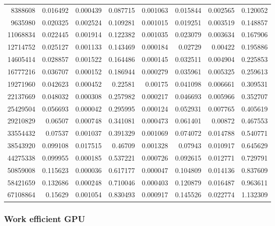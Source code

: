 \begin{tabular}{r r r r r r r r}
8388608 & 0.016492 & 0.000439 & 0.087715 & 0.001063 & 0.015844 & 0.002565 & 0.120052 \\
9635980 & 0.020325 & 0.002524 & 0.109281 & 0.001015 & 0.019251 & 0.003519 & 0.148857 \\
11068834 & 0.022445 & 0.001914 & 0.122382 & 0.001035 & 0.023079 & 0.003634 & 0.167906 \\
12714752 & 0.025127 & 0.001133 & 0.143469 & 0.000184 & 0.02729 & 0.00422 & 0.195886 \\
14605414 & 0.028857 & 0.001522 & 0.164486 & 0.000145 & 0.032511 & 0.004904 & 0.225853 \\
16777216 & 0.036707 & 0.000152 & 0.186944 & 0.000279 & 0.035961 & 0.005325 & 0.259613 \\
19271960 & 0.042623 & 0.000452 & 0.22581 & 0.00175 & 0.041098 & 0.006661 & 0.309531 \\
22137669 & 0.048032 & 0.000308 & 0.257982 & 0.000217 & 0.046693 & 0.005966 & 0.352707 \\
25429504 & 0.056693 & 0.000042 & 0.295995 & 0.000124 & 0.052931 & 0.007765 & 0.405619 \\
29210829 & 0.06507 & 0.000748 & 0.341081 & 0.000473 & 0.061401 & 0.00872 & 0.467553 \\
33554432 & 0.07537 & 0.001037 & 0.391329 & 0.001069 & 0.074072 & 0.014788 & 0.540771 \\
38543920 & 0.099108 & 0.017515 & 0.46709 & 0.001328 & 0.07943 & 0.010917 & 0.645629 \\
44275338 & 0.099955 & 0.000185 & 0.537221 & 0.000726 & 0.092615 & 0.012771 & 0.729791 \\
50859008 & 0.115623 & 0.000036 & 0.617177 & 0.000047 & 0.104809 & 0.014136 & 0.837609 \\
58421659 & 0.132686 & 0.000248 & 0.710046 & 0.000403 & 0.120879 & 0.016487 & 0.963611 \\
67108864 & 0.15629 & 0.001054 & 0.830493 & 0.000917 & 0.145526 & 0.022774 & 1.132309 \\
\end{tabular}

\subsubsection{Work efficient GPU}

